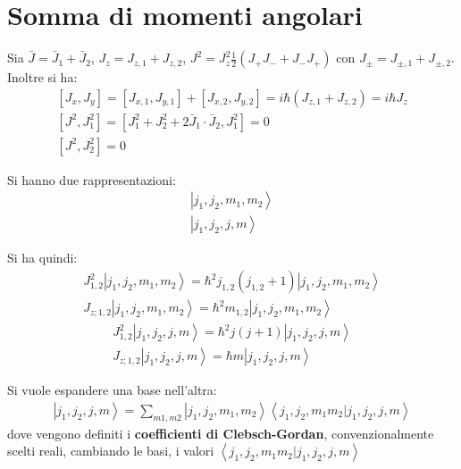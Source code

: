 \section{Somma di momenti angolari} %
Sia $\bar J=\bar J_1+\bar J_2$, $J_z=J_{z,1}+J_{z,2}$, $J^2=J_z^2\frac{1}{2}\left(J_+J_-+J_-J_+\right)$ con $J_{\pm}=J_{\pm,1}+J_{\pm,2}$. Inoltre si ha:
\begin{equation}\begin{split}
\left[J_x,J_y\right]=\left[J_{x,1},J_{y,1}\right]+\left[J_{x,2},J_{y,2}\right]=i\hbar \left(J_{z,1}+J_{z,2}\right)=i\hbar J_z \\
\left[J^2,J_1^2\right]=\left[J_1^2+J_2^2+2\bar J_1\cdot \bar J_2,J_1^2\right]=0 \\
\left[J^2,J_2^2\right]=0
\end{split}\end{equation}


Si hanno due rappresentazioni:
\begin{equation}\begin{split}
\left |j_1,j_2,m_1,m_2 \right\rangle \\
\left |j_1,j_2,j,m \right\rangle
\end{split}\end{equation}

Si ha quindi:
\begin{equation}\begin{split}
J_{1,2}^2\left |j_1,j_2,m_1,m_2 \right\rangle =\hbar ^2j_{1,2}\left(j_{1,2}+1\right)\left |j_1,j_2,m_1,m_2 \right\rangle \\
J_{z;1,2}\left |j_1,j_2,m_1,m_2 \right\rangle =\hbar ^2m_{1,2}\left |j_1,j_2,m_1,m_2 \right\rangle 
\end{split}\end{equation}
\begin{equation}\begin{split}
J_{1,2}^2\left |j_1,j_2,j,m \right\rangle=\hbar ^2j\left(j+1\right)\left |j_1,j_2,j,m \right\rangle \\
J_{z;1,2}\left |j_1,j_2,j,m \right\rangle=\hbar m\left |j_1,j_2,j,m \right\rangle
\end{split}\end{equation}

Si vuole espandere una base nell'altra:
\begin{equation}\begin{split}
\left |j_1,j_2,j,m \right\rangle=\sum_{m1,m2}{\left |j_1,j_2,m_1,m_2 \right\rangle\left\langle j_1,j_2,m_1m_2|j_1,j_2,j,m \right\rangle}
\end{split}\end{equation}
dove vengono definiti i \textbf{coefficienti di Clebsch-Gordan}, convenzionalmente scelti reali, cambiando le basi, i valori $\left\langle j_1,j_2,m_1m_2|j_1,j_2,j,m \right\rangle$

